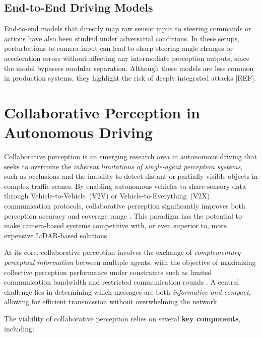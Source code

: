 \subsection{End-to-End Driving Models}
End-to-end models that directly map raw sensor input to steering commands or actions have also been studied under adversarial conditions. 
In these setups, perturbations to camera input can lead to sharp steering angle changes or acceleration errors without affecting any intermediate perception outputs, since the model bypasses modular separation. 
Although these models are less common in production systems, they highlight the risk of deeply integrated attacks [REF].

\section{Collaborative Perception in Autonomous Driving}

Collaborative perception is an emerging research area in autonomous driving that seeks to overcome the \textit{inherent limitations of single-agent perception systems}, such as occlusions and the inability to detect distant or partially visible objects in complex traffic scenes. 
By enabling autonomous vehicles to share sensory data through Vehicle-to-Vehicle~(V2V) or Vehicle-to-Everything~(V2X) communication protocols, collaborative perception significantly improves both perception accuracy and coverage range \cite{hu2022where2commcommunicationefficientcollaborativeperception, xu2022cobevtcooperativebirdseye}. 
This paradigm has the potential to make camera-based systems competitive with, or even superior to, more expensive LiDAR-based solutions.

At its core, collaborative perception involves the exchange of \textit{complementary perceptual information} between multiple agents, with the objective of maximizing collective perception performance under constraints such as limited communication bandwidth and restricted communication rounds \cite{hu2023collaborationhelpscameraovertake}.
A central challenge lies in determining which messages are both \textit{informative and compact}, allowing for efficient transmission without overwhelming the network.

The viability of collaborative perception relies on several \textbf{key components}, including:

